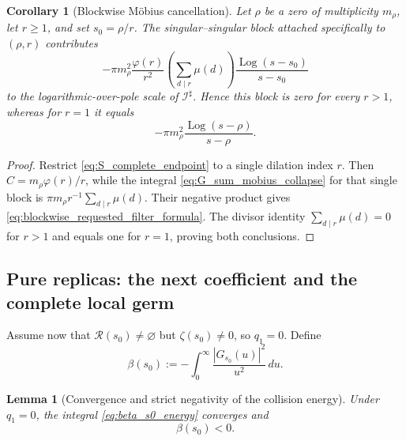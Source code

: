 \documentclass[11pt]{amsart}
\numberwithin{equation}{section}
\theoremstyle{plain}
\newtheorem{lemma}[theorem]{Lemma}
\newtheorem{corollary}[theorem]{Corollary}
\theoremstyle{definition}
\theoremstyle{remark}
\newcommand{\Log}{\operatorname{Log}}
\begin{document}
\begin{corollary}[Blockwise M\"obius cancellation]
\label{cor:blockwise_mobius_filter}
Let \(\rho\) be a zero of multiplicity \(m_\rho\), let \(r\ge1\), and set
\(s_0=\rho/r\).  The singular--singular block attached specifically to
\((\rho,r)\) contributes
\begin{equation}
\boxed{
-\pi m_\rho^2\frac{\varphi(r)}{r^2}
\left(\sum_{d\mid r}\mu(d)\right)
\frac{\Log(s-s_0)}{s-s_0}}
\label{eq:blockwise_requested_filter_formula}
\end{equation}
to the logarithmic-over-pole scale of \(\mathcal I^\sharp\).  Hence this
block is zero for every \(r>1\), whereas for \(r=1\) it equals
\begin{equation}
-\pi m_\rho^2\frac{\Log(s-\rho)}{s-\rho}.
\label{eq:r1_surviving_block}
\end{equation}
\end{corollary}

\begin{proof}
Restrict \eqref{eq:S_complete_endpoint} to a single dilation index \(r\).
Then \(C=m_\rho\varphi(r)/r\), while the integral
\eqref{eq:G_sum_mobius_collapse} for that single block is
\(\pi m_\rho r^{-1}\sum_{d\mid r}\mu(d)\).  Their negative product gives
\eqref{eq:blockwise_requested_filter_formula}.  The divisor identity
\(\sum_{d\mid r}\mu(d)=0\) for \(r>1\) and equals one for \(r=1\), proving
both conclusions.
\end{proof}

\subsection{Pure replicas: the next coefficient and the complete local germ}
\label{subsec:pure_replica_beta}

Assume now that \(\mathcal R(s_0)\ne\varnothing\) but
\(\zeta(s_0)\ne0\), so \(q_1=0\).  Define
\begin{equation}
\beta(s_0)
:=-\int_0^\infty\frac{|G_{s_0}(u)|^2}{u^2}\,du.
\label{eq:beta_s0_energy}
\end{equation}

\begin{lemma}[Convergence and strict negativity of the collision energy]
\label{lem:beta_s0_negative}
Under \(q_1=0\), the integral \eqref{eq:beta_s0_energy} converges and
\begin{equation}
\boxed{\beta(s_0)<0.}
\label{eq:beta_s0_negative}
\end{equation}
\end{lemma}
\end{document}
